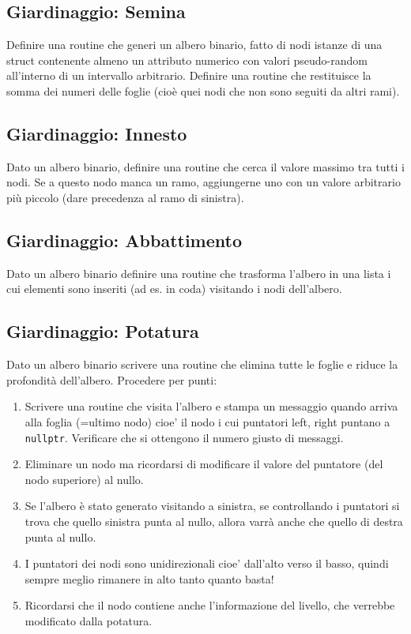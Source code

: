 \documentclass{article}
\begin{document}
\subsection{Giardinaggio: Semina}
Definire una routine che generi un albero binario, fatto di nodi istanze di una struct contenente almeno un attributo numerico con valori pseudo-random all'interno di un intervallo
arbitrario. Definire una routine che restituisce la somma dei numeri delle foglie (cioè quei nodi che non sono seguiti da altri rami).

\subsection{Giardinaggio: Innesto}
Dato un albero binario, definire una routine che cerca il valore massimo tra
tutti i nodi. Se a questo nodo manca un ramo, aggiungerne uno con un valore arbitrario più piccolo (dare precedenza al ramo di sinistra).

\subsection{Giardinaggio: Abbattimento}
Dato un albero binario definire una routine che trasforma l'albero in una lista i cui elementi sono inseriti (ad es. in coda) visitando i nodi dell'albero.

\subsection{Giardinaggio: Potatura}
Dato un albero binario scrivere una routine che elimina tutte le foglie e riduce la profondità dell'albero. Procedere per punti:
	\begin{enumerate}
	\item Scrivere una routine che visita l'albero e stampa un messaggio quando arriva alla foglia (=ultimo nodo) cioe' il nodo i cui puntatori left, right puntano a \texttt{nullptr}. Verificare che si ottengono il numero giusto di messaggi.
	\item Eliminare un nodo ma ricordarsi di modificare il valore del puntatore (del nodo superiore) al nullo.
	\item Se l'albero è stato generato visitando a sinistra, se controllando i puntatori si trova che quello sinistra punta al nullo, allora varrà anche che quello di destra punta al nullo.
	\item I puntatori dei nodi sono unidirezionali cioe' dall'alto verso il basso, quindi sempre meglio rimanere in alto tanto quanto basta!
	\item Ricordarsi che il nodo contiene anche l'informazione del livello, che verrebbe modificato dalla potatura.
	\end{enumerate}
\end{document}
